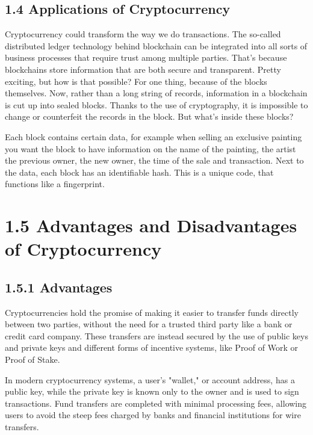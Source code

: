 	 \subsection*{1.4 Applications of Cryptocurrency}
	 
	 Cryptocurrency could transform the way we do transactions. The so-called distributed ledger technology behind blockchain can be integrated into all sorts of business processes that require trust among multiple parties. That’s because blockchains store information that are both secure and transparent. Pretty exciting, but how is that possible? For one thing, because of the blocks themselves. Now, rather than a long string of records, information in a blockchain is cut up into sealed blocks. Thanks to the use of cryptography, it is impossible to change or counterfeit the records in the block. But what’s inside these blocks?\vspace{.3cm}
	 
	 Each block contains certain data, for example when selling an exclusive painting you want the block to have information on the name of the painting, the artist the previous owner, the new owner, the time of the sale and transaction. Next to the data, each block has an identifiable hash. This is a unique code, that functions like a fingerprint.\vspace{.3cm}
	 
	 \section*{1.5 Advantages and Disadvantages of Cryptocurrency}
	 \subsection*{1.5.1 Advantages}
	 Cryptocurrencies hold the promise of making it easier to transfer funds directly between two parties, without the need for a trusted third party like a bank or credit card company. These transfers are instead secured by the use of public keys and private keys and different forms of incentive systems, like Proof of Work or Proof of Stake.
	 
	 In modern cryptocurrency systems, a user's "wallet," or account address, has a public key, while the private key is known only to the owner and is used to sign transactions. Fund transfers are completed with minimal processing fees, allowing users to avoid the steep fees charged by banks and financial institutions for wire transfers.
	 
